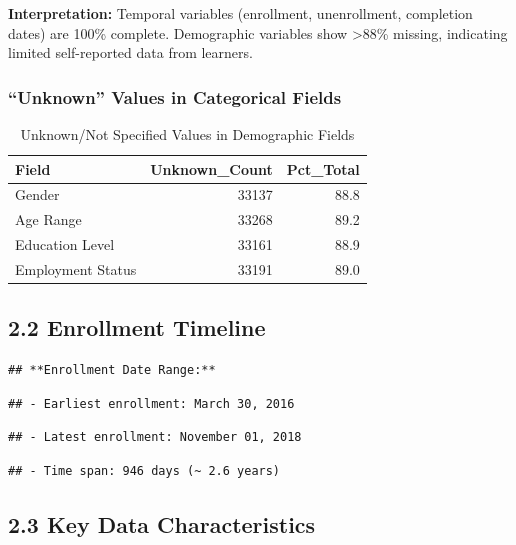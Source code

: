 \documentclass[
]{article}
\begin{document}
\textbf{Interpretation:} Temporal variables (enrollment, unenrollment,
completion dates) are 100\% complete. Demographic variables show
\textgreater88\% missing, indicating limited self-reported data from
learners.

\subsubsection{``Unknown'' Values in Categorical
Fields}\label{unknown-values-in-categorical-fields}

\begin{longtable}[t]{lrr}
\caption{\label{tab:unknown-values}Unknown/Not Specified Values in Demographic Fields}\\
\toprule
Field & Unknown\_Count & Pct\_Total\\
\midrule
Gender & 33137 & 88.8\\
Age Range & 33268 & 89.2\\
Education Level & 33161 & 88.9\\
Employment Status & 33191 & 89.0\\
\bottomrule
\end{longtable}

\subsection{2.2 Enrollment Timeline}\label{enrollment-timeline}

\begin{verbatim}
## **Enrollment Date Range:**
\end{verbatim}

\begin{verbatim}
## - Earliest enrollment: March 30, 2016
\end{verbatim}

\begin{verbatim}
## - Latest enrollment: November 01, 2018
\end{verbatim}

\begin{verbatim}
## - Time span: 946 days (~ 2.6 years)
\end{verbatim}

\subsection{2.3 Key Data
Characteristics}\label{key-data-characteristics}
\end{document}
